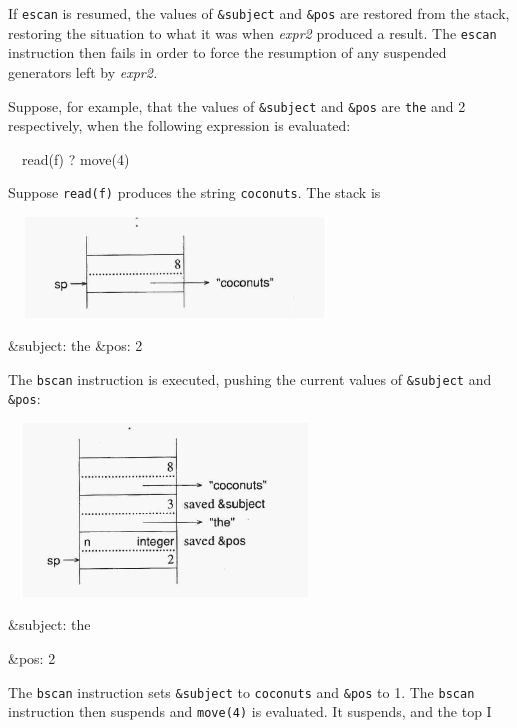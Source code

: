 If \texttt{escan} is resumed, the values of \texttt{\&subject} and
\texttt{\&pos} are restored from the stack, restoring the situation to
what it was when \textit{expr2} produced a result. The \texttt{escan}
instruction then fails in order to force the resumption of any
suspended generators left by \textit{expr2.}

Suppose, for example, that the values of \texttt{\&subject} and
\texttt{\&pos} are \texttt{{\textquotedbl}the{\textquotedbl}} and 2
respectively, when the following expression is evaluated:

{\ttfamily\mdseries
\ \ read(f) ? move(4)}

Suppose \texttt{read(f)} produces the string
\texttt{{\textquotedbl}coconuts{\textquotedbl}}. The stack is

\ \  \includegraphics[width=3.2063in,height=1.048in]{ib-img/ib-img072.jpg} 

{\ttfamily\mdseries
\&subject: {\textquotedbl}the{\textquotedbl}\newline
\&pos: 2}

The \texttt{bscan} instruction is executed, pushing the current values
of \texttt{\&subject} and \texttt{\&pos}:

{\sffamily
\ \  \includegraphics[width=2.9925in,height=1.8098in]{ib-img/ib-img073.jpg} }

{\ttfamily\mdseries
\&subject: {\textquotedbl}the{\textquotedbl}}

{\ttfamily\mdseries
\&pos: 2}

The \texttt{bscan} instruction sets \texttt{\&subject} to
\texttt{{\textquotedbl}coconuts{\textquotedbl}} and \texttt{\&pos} to
1. The \texttt{bscan} instruction then suspends and \texttt{move(4)}
is evaluated. It suspends, and the top I

